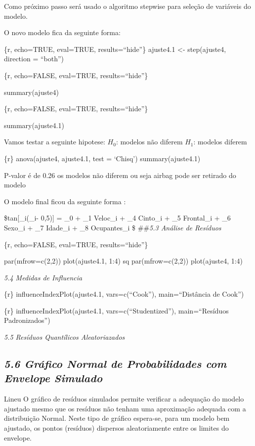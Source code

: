 \documentclass[]{article}
\begin{document}
Como próximo passo será usado o algoritmo stepwise para seleção de
variáveis do modelo.

O novo modelo fica da seguinte forma:

\{r, echo=TRUE, eval=TRUE, results=``hide''\} ajuste4.1 \textless{}-
step(ajuste4, direction = ``both'')

\{r, echo=FALSE, eval=TRUE, results=``hide''\}

summary(ajuste4)

\{r, echo=FALSE, eval=TRUE, results=``hide''\}

summary(ajuste4.1)

Vamos testar a seguinte hipotese: \(H_0\): modelos não diferem \(H_1\):
modelos diferem

\{r\} anova(ajuste4, ajuste4.1, test = `Chisq') summary(ajuste4.1)

P-valor é de 0.26 os modelos não diferem ou seja airbag pode ser
retirado do modelo

O modelo final ficou da seguinte forma :

\$tan{[}\pi\_i(\mu\_i- 0,5){]} = \beta\_0 + \beta\_1 Veloc\_i + \beta\_4
Cinto\_i + \beta\_5 Frontal\_i + \beta\_6 Sexo\_i + \beta\_7 Idade\_i +
\beta\_8 Ocupantes\_i \$ \#\#\emph{5.3 Análise de Resíduos}

\{r, echo=FALSE, eval=TRUE, results=``hide''\}

par(mfrow=c(2,2)) plot(ajuste4.1, 1:4) sq par(mfrow=c(2,2))
plot(ajuste4, 1:4)

\emph{5.4 Medidas de Influencia}

\{r\} influenceIndexPlot(ajuste4.1, vars=c(``Cook''), main=``Distância
de Cook'')

\{r\} influenceIndexPlot(ajuste4.1, vars=c(``Studentized''),
main=``Resíduos Padronizados'')

\emph{5.5 Resíduos Quantílicos Aleatoriazados}

\subsection{\texorpdfstring{\emph{5.6 Gráfico Normal de Probabilidades
com Envelope
Simulado}}{5.6 Gráfico Normal de Probabilidades com Envelope Simulado}}\label{grafico-normal-de-probabilidades-com-envelope-simulado}

Lineu O gráfico de resíduos simulados permite verificar a adequação do
modelo ajustado mesmo que os resíduos não tenham uma aproximação
adequada com a distribuição Normal. Neste tipo de gráfico espera-se,
para um modelo bem ajustado, os pontos (resíduos) dispersos
aleatoriamente entre os limites do envelope.
\end{document}
